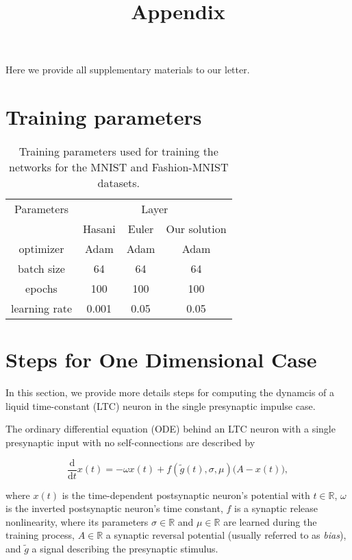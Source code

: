 \documentclass{article}
\title{Appendix}
\date{}
\begin{document}
\maketitle

Here we provide all supplementary materials to our letter. 

\appendix
\section{Training parameters}

\begin{table}[htb]
    \centering
    \caption{Training parameters used for training the networks for the MNIST and Fashion-MNIST datasets.}
    \label{tab:fashion_mnist}
    \begin{tabular}{c||c|c|c}
    \hline
    Parameters & \multicolumn{3}{c}{Layer} \\
    & Hasani & Euler & Our solution \\
    \hline \hline
    optimizer & Adam & Adam & Adam \\ 
    batch size & 64 & 64 & 64  \\ 
    epochs & 100 & 100 & 100  \\ 
    learning rate & 0.001 & 0.05 & 0.05 \\
    \hline
    \end{tabular}
\end{table}


\section{Steps for One Dimensional Case}
\setlength\parindent{0pt}

In this section, we provide more details steps for computing the dynamcis of a liquid time-constant (LTC) neuron in the single presynaptic impulse case. 

The ordinary differential equation (ODE) behind an LTC neuron with a single presynaptic input with no self-connections are described by ~\cite{Hasani_liquid_2021}


\begin{equation}\label{app: ltc ODE}
\frac{\mathrm{d}}{\mathrm{d}t}x(t)=-\omega x(t) + f(\tilde{g}(t), \sigma, \mu)\big( A - x(t)\big),
\end{equation}

where $x(t)$ is the time-dependent postsynaptic neuron's potential with $t\in\mathbb{R}$,  $\omega$ is the inverted postsynaptic neuron's time constant, $f$ is a synaptic release nonlinearity, where its parameters $\sigma \in\mathbb{R}$ and $\mu\in\mathbb{R}$ are learned during the training process, $A\in\mathbb{R}$ a synaptic reversal potential (usually referred to as \textit{bias}), and $\tilde{g}$ a signal describing the presynaptic stimulus. 
\end{document}
